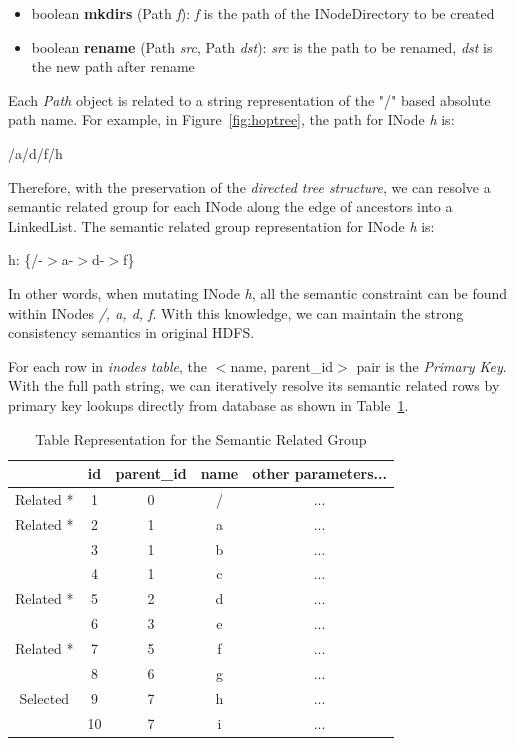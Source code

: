 \begin{itemize}[noitemsep]
	\item boolean \textbf{mkdirs} (Path \textit{f}): \textit{f} is the path of the INodeDirectory to be created
	\item boolean \textbf{rename} (Path \textit{src}, Path \textit{dst}): \textit{src} is the path to be renamed, \textit{dst} is the new path after rename
\end{itemize} 

\noindent Each \textit{Path} object is related to a string representation of the "/" based absolute path name. For example, in Figure~\ref{fig:hoptree}, the path for INode \textit{h} is: 
\begin{center}
	/a/d/f/h
\end{center}

\noindent Therefore, with the preservation of the \textit{directed tree structure}, we can resolve a semantic related group for each INode along the edge of ancestors into a LinkedList. The semantic related group representation for INode \textit{h} is:
\begin{center}
	h: \{/-$>$a-$>$d-$>$f\}
\end{center}

\noindent In other words, when mutating INode \textit{h}, all the semantic constraint can be found within INodes \textit{/, a, d, f}. With this knowledge, we can maintain the strong consistency semantics in original HDFS.

\noindent For each row in \textit{inodes table}, the $<$name, parent\_id$>$ pair is the \textit{Primary Key}. With the full path string, we can iteratively resolve its semantic related rows by primary key lookups directly from database as shown in Table~\ref{table:semanticrelatedTable}.

\begin{table}[h]
	\centering
	\begin{tabular}{|c|c|c|c|c|}
		\hline
		~ & \textbf{id} & \textbf{parent\_id} & \textbf{name} & \textbf{other parameters...} \\ \hline
		Related * & 1 & 0 & / & ... \\ \hline
		Related * & 2 & 1 & a & ... \\ \hline
		~ & 3 & 1 & b & ... \\ \hline
		~ & 4 & 1 & c & ... \\ \hline
		Related * & 5 & 2 & d & ... \\ \hline
		~ & 6 & 3 & e & ... \\ \hline
		Related * & 7 & 5 & f & ... \\ \hline
		~ & 8 & 6 & g & ... \\ \hline
		Selected \checkmark & 9 & 7 & h & ... \\ \hline
		~ & 10 & 7 & i & ... \\ \hline
	\end{tabular}
	\caption{Table Representation for the Semantic Related Group}
	\label{table:semanticrelatedTable}
\end{table}

